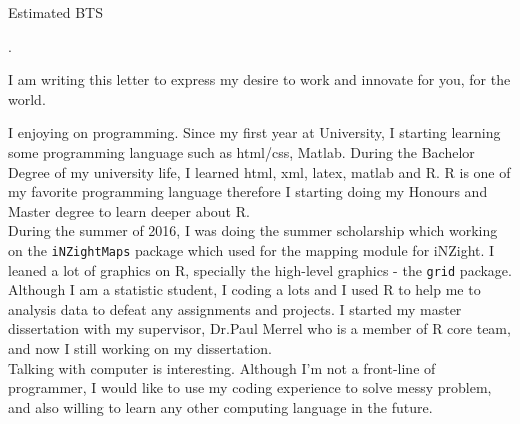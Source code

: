 \documentclass[11pt,a4paper,sans]{moderncv} %
\begin{document}






\clearpage

\date{\today} %
\opening{Estimated BTS} %
\closing{.} %

I am writing this letter to express my desire to work and innovate for you, for the world.

I enjoying on programming. Since my first year at University, I starting learning some programming language such as html/css, Matlab. During the Bachelor Degree of my university life, I learned html, xml, latex, matlab and R. R is one of my favorite programming language therefore I starting doing my Honours and Master degree to learn deeper about R.\\

During the summer of 2016, I was doing the summer scholarship which working on the \texttt{iNZightMaps} package which used for the mapping module for iNZight. I leaned a lot of graphics on R, specially the high-level graphics - the \texttt{grid} package. \\

Although I am a statistic student, I coding a lots and I used R to help me to analysis data to defeat any assignments and projects.
I started my master dissertation with my supervisor, Dr.Paul Merrel who is a member of R core team, and now I still working on my dissertation.\\

Talking with computer is interesting. Although I'm not a front-line of programmer, I would like to use my coding experience to solve messy problem, and also willing to learn any other computing language in the future.\\

\makeletterclosing %

\end{document}

